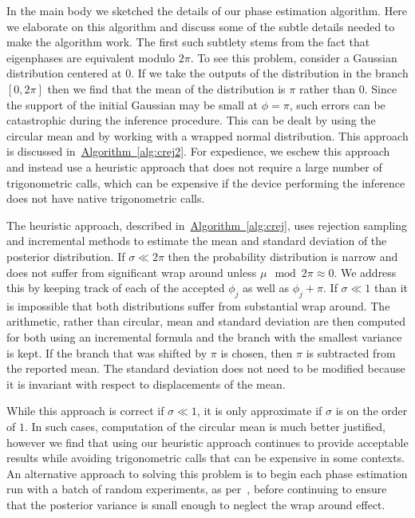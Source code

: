 \documentclass[aps,pra,amsmath,twocolumn,amssymb,superscriptaddress]{revtex4-1}
\newcommand{\alg}[1]{\hyperref[alg:#1]{Algorithm~\ref*{alg:#1}}}
\begin{document}
In the main body we sketched the details of our phase estimation algorithm.  Here we elaborate on this algorithm and discuss some of the
subtle details needed to make the algorithm work.  The first such subtlety stems from the fact that eigenphases are equivalent modulo $2\pi$.  
To see this problem, consider a Gaussian distribution centered at $0$.  If we take the outputs of the distribution in the branch $[0,2\pi]$ then we find that the mean of the distribution is $\pi$ rather than $0$.  Since the support of the initial Gaussian may be small at $\phi=\pi$, such errors can be catastrophic during the inference procedure.  This can be dealt by using the circular mean and by working with a wrapped normal distribution.  This approach is discussed in~\alg{crej2}.  For expedience, we eschew this approach and instead use a heuristic approach that does  not require a large number of trigonometric calls, which can be expensive if the device performing the inference does not have native trigonometric calls.

The heuristic approach, described in~\alg{crej}, uses rejection sampling and incremental methods to estimate the mean and standard deviation of the posterior distribution.  If $\sigma\ll 2\pi$ then the probability distribution is narrow and does not suffer from significant wrap around unless $\mu \mod 2\pi \approx 0$.  We address this by keeping track of each of the accepted $\phi_j$ as well as $\phi_j+\pi$.  If $\sigma\ll 1$ than it is impossible that both distributions suffer from substantial wrap around.  The arithmetic, rather than circular, mean and standard deviation are then computed for both using an incremental formula and the branch with the smallest variance is kept.  If the branch that was shifted by $\pi$ is chosen, then $\pi$ is subtracted from the reported mean.  The standard deviation does not need to be modified because it is invariant with respect to displacements of the mean.

While this approach is correct if $\sigma\ll 1$, it is only approximate if $\sigma$ is on the order of $1$.  In such cases, computation of the circular mean is much better justified, however we find that using our heuristic approach continues to provide acceptable results while avoiding trigonometric calls that can be expensive in some contexts.  An alternative approach to solving this problem is to begin each phase estimation run with a batch of random experiments, as per~\cite{SHF14}, before continuing to ensure that the posterior variance is small enough to neglect the wrap around effect.
\end{document}
